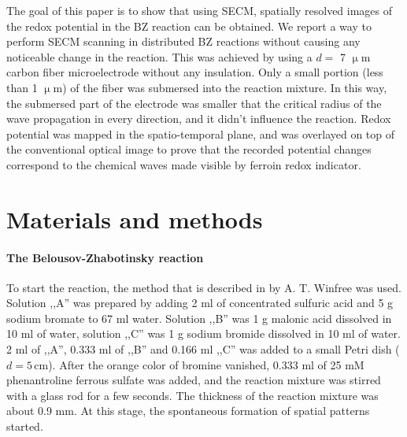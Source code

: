 \documentclass[3p, twocolumn]{elsarticle}
\begin{document}
The goal of this paper is to show that using SECM, spatially resolved images of the redox potential in the BZ reaction can be obtained.
We report a way to perform SECM scanning in distributed BZ reactions without causing any noticeable change in the reaction.
This was achieved by using a $d=$ 7 $\upmu$m carbon fiber microelectrode without any insulation.
Only a small portion (less than 1 $\upmu$m) of the fiber was submersed into the reaction mixture.
In this way, the submersed part of the electrode was smaller that the critical radius of the wave propagation \cite{foerster1989critical} in every direction, and it didn't influence the reaction.
Redox potential was mapped in the spatio-temporal plane, and was overlayed on top of the conventional optical image to prove that the recorded potential changes correspond to the chemical waves made visible by ferroin redox indicator.

\section{Materials and methods}
\paragraph{The Belousov-Zhabotinsky reaction} To start the reaction, the method that is described in \cite{winfree2001geometry} by A. T. Winfree was used.
Solution ,,A'' was prepared by adding 2 ml of concentrated sulfuric acid and 5 g sodium bromate to 67 ml water.
Solution ,,B'' was 1 g malonic acid dissolved in 10 ml of water, solution ,,C'' was 1 g sodium bromide dissolved in 10 ml of water.
2 ml of ,,A'', 0.333 ml of ,,B'' and 0.166 ml ,,C'' was added to a small Petri dish ($d=5 \,$cm).
After the orange color of bromine vanished, 0.333 ml of 25 mM phenantroline ferrous sulfate was added, and the reaction mixture was stirred with a glass rod for a few seconds.
The thickness of the reaction mixture was about 0.9 mm.
At this stage, the spontaneous formation of spatial patterns started.
\end{document}
